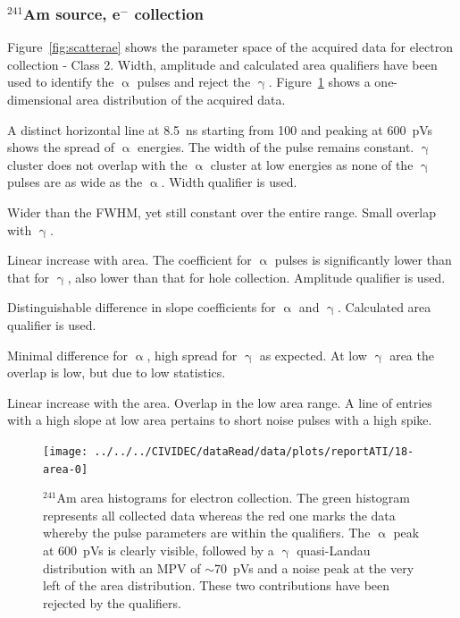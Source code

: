 \subsubsection{$^{241}$Am source, e$^-$ collection}
Figure~\ref{fig:scatterae} shows the parameter space of the acquired data for electron collection - Class 2. Width, amplitude and calculated area qualifiers have been used to identify the $\upalpha$ pulses and reject the $\upgamma$. Figure~\ref{fig:1dalphaareae} shows a one-dimensional area distribution of the acquired data.
\begin{description}
\setlength\itemsep{-0.3em}
\item[Width: ] A distinct horizontal line at 8.5~ns starting from 100 and peaking at 600~pVs shows the spread of $\upalpha$ energies. The width of the pulse remains constant. $\upgamma$ cluster does not overlap with the $\upalpha$ cluster at low energies as none of the $\upgamma$ pulses are as wide as the $\upalpha$. Width qualifier is used.
\item[Base width: ] Wider than the FWHM, yet still constant over the entire range. Small overlap with $\upgamma$.
\item[Amplitude: ] Linear increase with area. The coefficient for $\upalpha$ pulses is significantly lower than that for $\upgamma$, also lower than that for hole collection. Amplitude qualifier is used.
\item[Calculated area: ] Distinguishable difference in slope coefficients for $\upalpha$ and $\upgamma$. Calculated area qualifier is used.
\item[Base width -- width: ] Minimal difference for $\upalpha$, high spread for $\upgamma$ as expected. At low $\upgamma$ area the overlap is low, but due to low statistics.
\item[Slope: ] Linear increase with the area. Overlap in the low area range. A line of entries with a high slope at low area pertains to short noise pulses with a high spike.
\end{description}

\begin{figure}[]
\centering
\texttt{[image: ../../../CIVIDEC/dataRead/data/plots/reportATI/18-area-0]}
\caption{$^{241}$Am area histograms for electron collection. The green histogram represents all collected data whereas the red one marks the data whereby the pulse parameters are within the qualifiers. The $\upalpha$ peak at 600~pVs is clearly visible, followed by a $\upgamma$ quasi-Landau distribution with an MPV of $\sim$70~pVs and a noise peak at the very left of the area distribution. These two contributions have been rejected by the qualifiers.}
\label{fig:1dalphaareae}
\end{figure}




